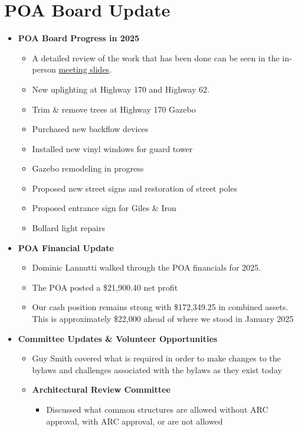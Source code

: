 \documentclass[12pt,a4paper]{article}
\begin{document}
\section*{POA Board Update}
\begin{itemize}
  \item \textbf{POA Board Progress in 2025}
  \begin{itemize}
    \item A detailed review of the work that has been done can be seen in the in-person \href{https://www.example.com}{meeting slides}.
    \item New uplighting at Highway 170 and Highway 62.
    \item Trim \& remove trees at Highway 170 Gazebo
    \item Purchased new backflow devices
    \item Installed new vinyl windows for guard tower
    \item Gazebo remodeling in progress
    \item Proposed new street signs and restoration of street poles
    \item Proposed entrance sign for Giles \& Iron
    \item Bollard light repairs
  \end{itemize}
  \item \textbf{POA Financial Update}
  \begin{itemize}
    \item Dominic Lannutti walked through the POA financials for 2025.
    \item The POA posted a \$21,900.40 net profit 
    \item Our cash position remains strong with \$172,349.25 in combined assets. This is approximately \$22,000 ahead of where we stood in January 2025
  \end{itemize}
  \item \textbf{Committee Updates \& Volunteer Opportunities}
  \begin{itemize}
    \item Guy Smith covered what is required in order to make changes to the bylaws and challenges associated with the bylaws as they exist today
    \item \textbf{Architectural Review Committee}
    \begin{itemize}
      \item Discussed what common structures are allowed without ARC approval, with ARC approval, or are not allowed
    \end{itemize}
  \end{itemize}
\end{itemize}
\end{document}
